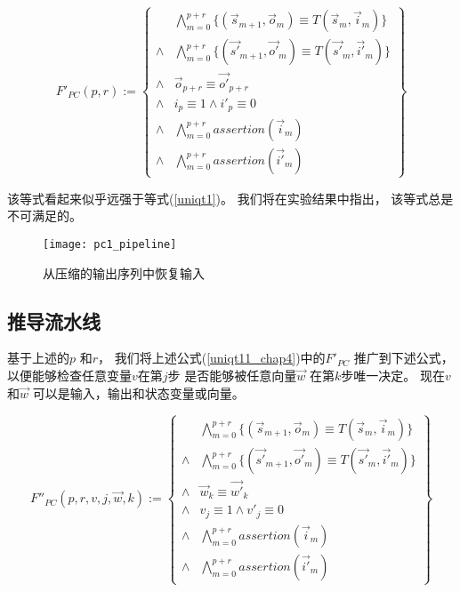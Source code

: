\begin{equation}\label{uniqt11_chap4}
F'_{PC}(p,r):=
\left\{
\begin{array}{cc}
&\bigwedge_{m=0}^{p+r}
\{
(\vec{s}_{m+1},\vec{o}_m)\equiv T(\vec{s}_m,\vec{i}_m)
\}
\\
\wedge&\bigwedge_{m=0}^{p+r}
\{
(\vec{s'}_{m+1},\vec{o'}_m)\equiv T(\vec{s'}_m,\vec{i'}_m)
\}
\\
\wedge&\vec{o}_{p+r}\equiv \vec{o'}_{p+r} \\
\wedge& i_{p}\equiv 1 \wedge  i'_{p}\equiv 0 \\
\wedge&\bigwedge_{m=0}^{p+r}assertion(\vec{i}_m) \\
\wedge&\bigwedge_{m=0}^{p+r}assertion(\vec{i'}_m)
\end{array}
\right\}
\end{equation}


该等式看起来似乎远强于等式(\ref{uniqt1})。
我们将在实验结果中指出，
该等式总是不可满足的。

\begin{figure}[t]
\begin{center}
\texttt{[image: pc1\_pipeline]}
\end{center}
\caption{从压缩的输出序列中恢复输入}
  \label{fig_pc1_chap4}
\end{figure}

\subsection{推导流水线}\label{subsec_inferstage}

基于上述的$p$ 和$r$，
我们将上述公式(\ref{uniqt11_chap4})中的$F'_{PC}$ 推广到下述公式，
以便能够检查任意变量$v$在第$j$步
是否能够被任意向量$\vec{w}$ 在第$k$步唯一决定。
现在$v$ 和$\vec{w}$ 可以是输入，输出和状态变量或向量。

\begin{equation}\label{uniqt2_chap5}
F''_{PC}(p,r,v,j,\vec{w},k):=
\left\{
\begin{array}{cc}
&\bigwedge_{m=0}^{p+r}
\{
(\vec{s}_{m+1},\vec{o}_m)\equiv T(\vec{s}_m,\vec{i}_m)
\}
\\
\wedge&\bigwedge_{m=0}^{p+r}
\{
(\vec{s'}_{m+1},\vec{o'}_m)\equiv T(\vec{s'}_m,\vec{i'}_m)
\}
\\
\wedge&\vec{w}_{k}\equiv \vec{w'}_{k} \\
\wedge& v_{j}\equiv 1 \wedge  v'_{j}\equiv 0 \\
\wedge&\bigwedge_{m=0}^{p+r}assertion(\vec{i}_m) \\
\wedge&\bigwedge_{m=0}^{p+r}assertion(\vec{i'}_m)
\end{array}
\right\}
\end{equation}


